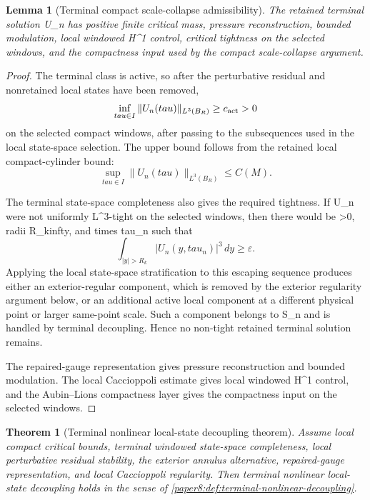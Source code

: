 \documentclass[11pt]{amsart}
\def\({}%
\def\){}%
\def\tau{tau}%
\def\infty{infty}%
\theoremstyle{plain}
\newtheorem{theorem}{Theorem}[section]
\newtheorem{lemma}[lemma]{Lemma}
\theoremstyle{definition}
\theoremstyle{remark}
\begin{document}
\begin{lemma}[Terminal compact scale-collapse admissibility]
\label{paper8:lem:terminal-scale-collapse-admissibility}
The retained terminal solution \(U_n\) has positive finite critical mass,
pressure reconstruction, bounded modulation, local windowed \(H^1\) control,
critical tightness on the selected windows, and the compactness input used by
the compact scale-collapse argument.
\end{lemma}

\begin{proof}
The terminal class is active, so after the perturbative residual and
nonretained local states have been removed,
\[
  \inf_{\tau\in I}\|U_n(\tau)\|_{L^3(B_R)}
  \ge c_{\rm act}>0
\]
on the selected compact windows, after passing to the subsequences used in the
local state-space selection.  The upper bound follows from the retained local
compact-cylinder bound:
\[
  \sup_{\tau\in I}\|U_n(\tau)\|_{L^3(B_R)}\le C(M).
\]

The terminal state-space completeness also gives the required tightness.  If
\(U_n\) were not uniformly \(L^3\)-tight on the selected windows, then there
would be \(\varepsilon>0\), radii \(R_k\to\infty\), and times \(\tau_n\) such
that
\[
  \int_{|y|>R_k}|U_n(y,\tau_n)|^3\,dy\ge\varepsilon.
\]
Applying the local state-space stratification to this escaping sequence
produces either an exterior-regular component, which is removed by the exterior
regularity argument below, or an additional active local component at a
different physical point or larger same-point scale.  Such a component belongs
to \(S_n\) and is handled by terminal decoupling.  Hence no non-tight retained
terminal solution remains.

The repaired-gauge representation gives pressure reconstruction and bounded
modulation.  The local Caccioppoli estimate gives local windowed \(H^1\)
control, and the Aubin--Lions compactness layer gives the compactness input on
the selected windows.
\end{proof}

\begin{theorem}[Terminal nonlinear local-state decoupling theorem]
\label{paper8:thm:terminal-nonlinear-decoupling}
Assume local compact critical bounds, terminal windowed state-space
completeness, local perturbative residual stability, the exterior annulus
alternative, repaired-gauge representation, and local Caccioppoli regularity.
Then
terminal nonlinear local-state decoupling holds in the sense of
\cref{paper8:def:terminal-nonlinear-decoupling}.
\end{theorem}
\end{document}
